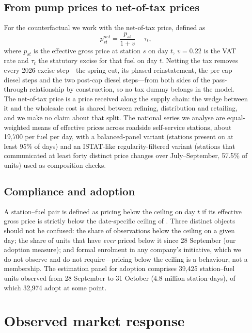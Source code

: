 \documentclass[11pt]{article}
\begin{document}
\subsection{From pump prices to net-of-tax prices}

For the counterfactual we work with the net-of-tax price, defined as
\[
p^{net}_{st} = \frac{p_{st}}{1+v} - \tau_t,
\]
where $p_{st}$ is the effective gross price at station $s$ on day $t$,
$v = 0.22$ is the VAT rate and $\tau_t$ the statutory excise for that fuel
on day $t$. Netting the tax removes every 2026 excise step---the spring
cut, its phased reinstatement, the pre-cap diesel steps and the two
post-cap diesel steps---from both sides of the pass-through relationship
by construction, so no tax dummy belongs in the model. The net-of-tax
price is a price received along the supply chain:
the wedge between it and the wholesale cost is shared between refining,
distribution and retailing, and we make no claim about that split. The
national series we analyse are equal-weighted means of effective prices
across roadside self-service stations, about 19{,}700 per fuel per day,
with a balanced-panel variant (stations present on at least 95\% of days)
and an ISTAT-like regularity-filtered variant (stations that communicated
at least forty distinct price changes over July--September, 57.5\% of
units) used as composition checks.

\subsection{Compliance and adoption}

A station--fuel pair is defined as pricing below the ceiling on day $t$ if
its effective gross price is strictly below the date-specific ceiling of
. Three distinct objects should not be confused: the
share of observations below the ceiling on a given day; the share of
units that have \emph{ever} priced below it since 28 September (our
adoption measure); and formal enrolment in any company's initiative,
which we do not observe and do not require---pricing below the ceiling is
a behaviour, not a membership. The estimation panel for adoption
comprises 39{,}425 station--fuel units observed from 28 September to
31 October (4.8 million station-days), of which 32{,}974 adopt at some
point.

\section{Observed market response}\label{sec:observed}
\end{document}
